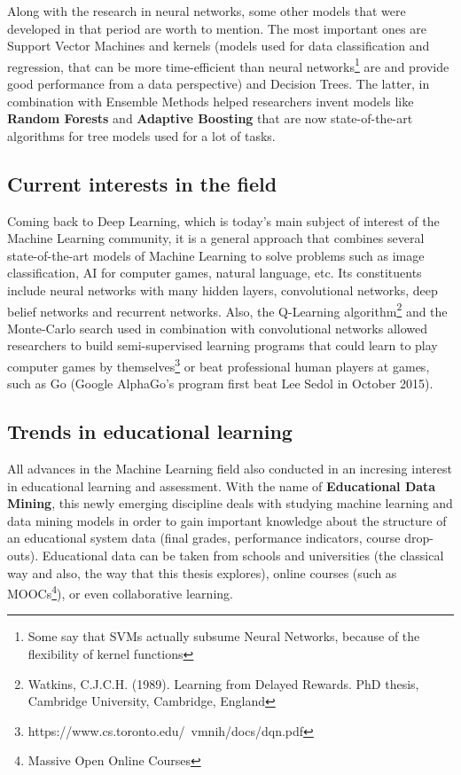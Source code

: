 Along with the research in neural networks, some other models that were developed in that 
period are worth to mention. The most important ones are Support Vector Machines and kernels 
(models used for data classification and regression, that can be more time-efficient 
than neural networks\footnote{Some say that SVMs actually subsume Neural Networks, because 
of the flexibility of kernel functions} are and provide good performance from a data 
perspective) and Decision Trees. The latter, in combination with Ensemble Methods 
helped researchers invent models like {\bf Random Forests} and {\bf Adaptive Boosting} 
that are now state-of-the-art algorithms for tree models used for a lot of tasks.

\subsection{Current interests in the field}

Coming back to Deep Learning, which is today's main subject of interest of the 
Machine Learning community, it is a general approach that combines several state-of-the-art 
models of Machine Learning to solve problems such as image classification, AI for 
computer games, natural language, etc. Its constituents include neural networks with many 
hidden layers, convolutional networks, deep belief networks and recurrent networks. 
Also, the Q-Learning algorithm\footnote{Watkins, C.J.C.H. (1989). Learning from Delayed Rewards. 
PhD thesis, Cambridge University, Cambridge, England} and the Monte-Carlo search used 
in combination with convolutional networks allowed researchers to build semi-supervised 
learning programs that could learn to play computer games by themselves\footnote
{https://www.cs.toronto.edu/~vmnih/docs/dqn.pdf} or beat professional human players at 
games, such as Go (Google AlphaGo's program first beat Lee Sedol in October 2015). 

\subsection{Trends in educational learning}

All advances in the Machine Learning field also conducted in an incresing interest in 
educational learning and assessment. With the name of {\bf Educational Data Mining}, 
this newly emerging discipline deals with studying machine learning and data mining 
models in order to gain important knowledge about the structure of an educational 
system data (final grades, performance indicators, course drop-outs). Educational 
data can be taken from schools and universities (the classical way and also, the way 
that this thesis explores), online courses (such as MOOCs\footnote{Massive Open 
Online Courses}), or even collaborative learning.

